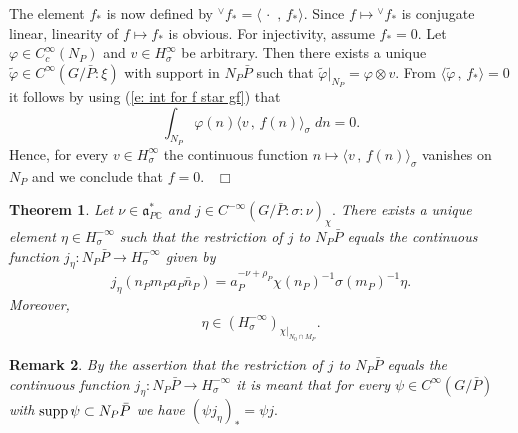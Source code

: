 \documentclass[12pt,a4paper]{article}
\newtheorem{Thm}{Theorem}
\newtheorem{Rem}[Thm]{Remark}
\newenvironment{thm}[0]{\begin{Thm}\noindent}%
{\end{Thm}}
\newenvironment{rem}[0]{\begin{Rem}\noindent\rm}%
{\end{Rem}}
\def\qed{~\hfill\hbox{$\Box$}\medbreak}
\def\msy#1{{\mathbb #1}}
\def\C{{\msy C}}
\def\gf{\varphi}
\def\gs{\sigma}
\def\got#1{\mathfrak #1}
\def\fa{{\got a}}
\def\to{\rightarrow}
\def\inp#1#2{\langle#1\,,\,#2\rangle}
\def\iC{{\scriptscriptstyle \C}}
\numberwithin{Thm}{section}
\numberwithin{equation}{section}
\def\supp{{\rm supp}}
\def\dotvar{\, \cdot\,}
\def\faPdc{{\fa_{P\iC}^*}}
\numberwithin{equation}{section}
\def\faPdc{\fa_{P\iC}^*}
\def\cchi{\chi}
\def\veec{\vee}%
\def\trw{{}^{\scriptscriptstyle\veec}}
\begin{document}
The element $f_*$ is  now defined by $\trw\! f_* = \inp{\dotvar}{f_*}.$ 
Since $f \mapsto \trw\!f_*$ is conjugate linear, 
linearity of $f \mapsto f_*$ is obvious. For injectivity, assume $f_* = 0.$ Let 
$\gf \in C_c^{\infty}(N_P)$ and $v \in H_\gs^\infty$ be arbitrary.
Then there exists a unique $\tilde \gf \in C^\infty(G/\bar P: \xi)$ with support in 
$N_P \bar P$ such that $\tilde \gf|_{N_P} = \gf\otimes v.$ From $\inp{\tilde \gf}{f_*} = 0$ 
it follows by using (\ref{e: int for f star gf}) that
$$ 
\int_{N_P} \gf(n) \inp{v}{f(n)}_\gs \; dn  = 0.
$$ 
Hence, for every $v \in H_\gs^\infty$ the continuous function 
$n \mapsto \inp{v}{f(n)}_\gs$ vanishes on $N_P$ and we  conclude that $f = 0.$ 
\qed

\begin{thm}
\label{t: evaluation of j}
Let $\nu \in \faPdc$ and $j \in C^{-\infty}(G/\bar P:\gs: \nu)_\cchi.$ There exists a unique
element $\eta \in H_\gs^{-\infty}$  such that the restriction of 
$j$ to $N_P\bar P$  equals the continuous function 
$j_\eta: N_P\bar P \to H_\gs^{-\infty}$ given 
by 
\begin{equation}
\label{e: formula j eta}
j_\eta(n_P m_P a_P \bar n_P) = a_P^{-\nu + \rho_P} \cchi(n_P)^{-1} \gs(m_P)^{-1} \eta. 
\end{equation}
%
Moreover, 
%
\begin{equation}
\label{e: behavior eta}
\eta \in (H_\gs^{-\infty})_{\cchi|_{N_0\cap M_P}}.
\end{equation} 
\end{thm}

\begin{rem} 
\label{r: meaning of equality vj j}
By the assertion that the restriction of $j$ to $N_P\bar P$ equals
the continuous function $j_\eta : N_P \bar P \to H^{-\infty}_\gs$ it is meant that
for every $\psi \in C^\infty(G/\bar P)$ with $\supp \,\psi \subset N_P \bar P$ we have
$(\psi j_\eta)_* = \psi j.$ 
\end{rem}
\end{document}
